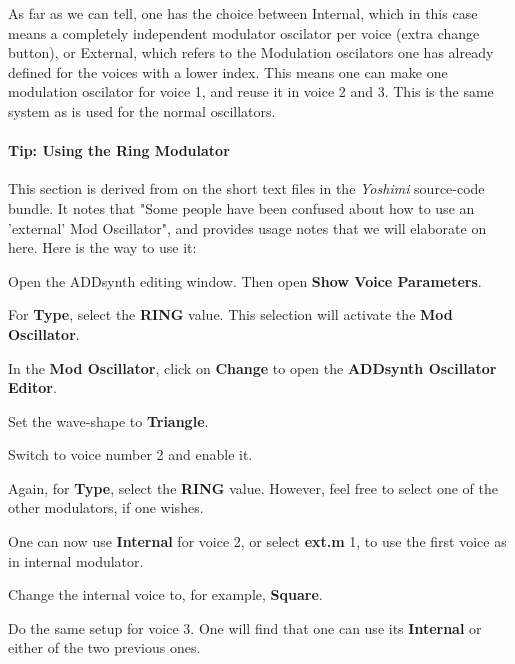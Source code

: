    As far as we can tell, one has the choice between Internal, which in this
   case means a completely independent modulator oscilator per voice (extra
   change button), or External, which refers to the Modulation
   oscilators one has already defined for the voices with a lower index.
   This means one can make one modulation oscilator for voice 1, and reuse it
   in voice 2 and 3.  This is the same system as is used for the normal
   oscillators.

\paragraph{Tip: Using the Ring Modulator}
\label{paragraph:tip_using_the_ring_modulator}

   This section is derived from on the short text files in the
   \textsl{Yoshimi} source-code bundle.  It notes that "Some people have
   been confused about how to use an 'external' Mod Oscillator", and
   provides usage notes that we will elaborate on here.  Here is the way to
   use it:

   \begin{enumber}
      \item Open the ADDsynth editing window.  Then open
         \textbf{Show Voice Parameters}.
      \item For \textbf{Type}, select the \textbf{RING} value.  This
      selection will activate the \textbf{Mod Oscillator}.
      \item In the \textbf{Mod Oscillator}, click on \textbf{Change} to open
      the \textbf{ADDsynth Oscillator Editor}.
      \item Set the wave-shape to \textbf{Triangle}.
      \item Switch to voice number 2 and enable it.
      \item Again, for \textbf{Type}, select the \textbf{RING} value.
      However, feel free to select one of the other modulators, if one
      wishes.
      \item One can now use \textbf{Internal} for voice 2, or select
      \textbf{ext.m} 1, to use the first voice as in internal modulator.
      \item Change the internal voice to, for example, \textbf{Square}.
      \item Do the same setup for voice 3.
      One will find that one can use its \textbf{Internal} or
      either of the two previous ones.
   \end{enumber}

